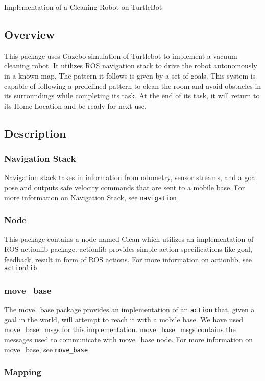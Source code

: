Implementation of a Cleaning Robot on Turtle\+Bot  \href{https://travis-ci.org/VBot2410/vacuum_bot}{\tt } \href{https://opensource.org/licenses/MIT}{\tt }

\subsection*{Overview}

This package uses Gazebo simulation of Turtlebot to implement a vacuum cleaning robot. It utilizes R\+OS navigation stack to drive the robot autonomously in a known map. The pattern it follows is given by a set of goals.  This system is capable of following a predefined pattern to clean the room and avoid obstacles in its surroundings while completing its task. At the end of its task, it will return to its Home Location and be ready for next use.

\subsection*{Description}

\subsubsection*{Navigation Stack}

Navigation stack takes in information from odometry, sensor streams, and a goal pose and outputs safe velocity commands that are sent to a mobile base. For more information on Navigation Stack, see \href{http://wiki.ros.org/navigation}{\tt navigation} \subsubsection*{Node}

This package contains a node named Clean which utilizes an implementation of R\+OS actionlib package. actionlib provides simple action specifications like goal, feedback, result in form of R\+OS actions. For more information on actionlib, see \href{http://wiki.ros.org/actionlib}{\tt actionlib} \subsubsection*{move\+\_\+base}

The move\+\_\+base package provides an implementation of an \href{http://wiki.ros.org/actionlib}{\tt action} that, given a goal in the world, will attempt to reach it with a mobile base. We have used move\+\_\+base\+\_\+msgs for this implementation. move\+\_\+base\+\_\+msgs contains the messages used to communicate with move\+\_\+base node. For more information on move\+\_\+base, see \href{http://wiki.ros.org/move_base}{\tt move\+\_\+base} \subsubsection*{Mapping}

